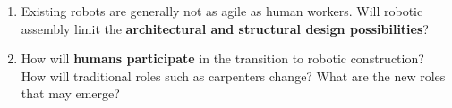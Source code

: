 \begin{enumerate}
\begin{enumerate}
	\item Existing robots are generally not as agile as human workers. Will robotic assembly limit the \textbf{architectural and structural design possibilities}?

	\item How will \textbf{humans participate} in the transition to robotic construction? How will traditional roles such as carpenters change? What are the new roles that may emerge?

\end{enumerate}
\end{enumerate}

